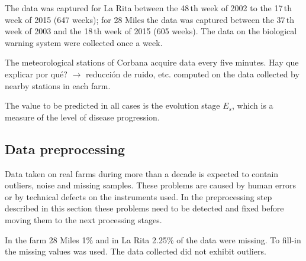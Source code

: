 The data was captured for La Rita between the 48\,th week of
2002 to the 17\,th week of 2015 (647 weeks); for 28 Miles the
data was captured between the 37\,th week of 2003 and the
18\,th week of 2015 (605 weeks).
%
The data on the biological warning system were collected once a
week.

The meteorological stations of Corbana acquire data every five
minutes.
%
{Hay que explicar por qué? $\rightarrow$ reducción de ruido, etc.}
%
computed on the data collected by nearby stations in each farm.




The value to be predicted in all cases is the evolution stage $E_s$,
which is a measure of the level of disease progression.

\subsection{Data preprocessing}

Data taken on real farms during more than a decade is expected to
contain outliers, noise and missing samples.  These problems are
caused by human errors or by technical defects on the instruments
used.  
%
In the preprocessing step described in this section these problems
need to be detected and fixed before moving them to the next
processing stages.

In the farm 28 Miles 1\% and in La Rita 2.25\% of the data were missing.
%
To fill-in the missing values  was used.
%
The data collected did not exhibit outliers.

